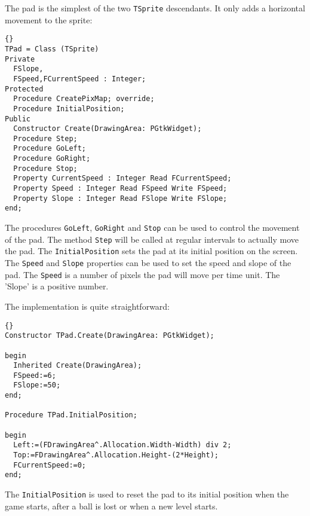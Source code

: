 \documentclass[10pt]{article}
\newcommand{\var}[1]{\texttt{#1}}
\begin{document}
The pad is the simplest of the two \var{TSprite} descendants. It only adds a
horizontal movement to the sprite:
\begin{lstlisting}{}
TPad = Class (TSprite)
Private
  FSlope,
  FSpeed,FCurrentSpeed : Integer;
Protected
  Procedure CreatePixMap; override;
  Procedure InitialPosition; 
Public  
  Constructor Create(DrawingArea: PGtkWidget);
  Procedure Step;
  Procedure GoLeft;
  Procedure GoRight;
  Procedure Stop;
  Property CurrentSpeed : Integer Read FCurrentSpeed;
  Property Speed : Integer Read FSpeed Write FSpeed;
  Property Slope : Integer Read FSlope Write FSlope;
end;
\end{lstlisting}{}
The procedures \var{GoLeft}, \var{GoRight} and \var{Stop} can be used to
control the movement of the pad. The method \var{Step} will be called at
regular intervals to actually move the pad. The \var{InitialPosition} 
sets the pad at its initial position on the screen. The \var{Speed} and 
\var{Slope} properties can be used to set the speed and slope of the pad.
The \var{Speed} is a number of pixels the pad will move per time unit.
The 'Slope' is a positive number. 

The implementation is quite straightforward:
\begin{lstlisting}{}
Constructor TPad.Create(DrawingArea: PGtkWidget);

begin
  Inherited Create(DrawingArea);
  FSpeed:=6;
  FSlope:=50;
end;

Procedure TPad.InitialPosition;

begin
  Left:=(FDrawingArea^.Allocation.Width-Width) div 2;
  Top:=FDrawingArea^.Allocation.Height-(2*Height);
  FCurrentSpeed:=0;
end;
\end{lstlisting}{}
The \var{InitialPosition} is used to reset the pad to its initial position
when the game starts, after a ball is lost or when a new level starts.
\end{document}
